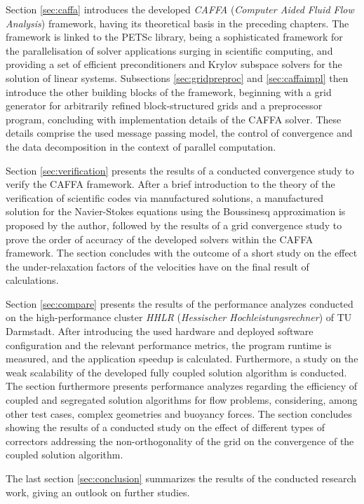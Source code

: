 Section \ref{sec:caffa} introduces the developed \emph{CAFFA} (\emph{Computer Aided Fluid Flow Analysis}) framework, having its theoretical basis in the preceding chapters. The framework is linked to the PETSc library, being a sophisticated framework for the parallelisation of solver applications surging in scientific computing, and providing a set of efficient preconditioners and Krylov subspace solvers for the solution of linear systems. Subsections \ref{sec:gridpreproc} and \ref{sec:caffaimpl} then introduce the other building blocks of the framework, beginning with a grid generator for arbitrarily refined block-structured grids and a preprocessor program, concluding with implementation details of the CAFFA solver. These details comprise the used message passing model, the control of convergence and the data decomposition in the context of parallel computation.

Section \ref{sec:verification} presents the results of a conducted convergence study to verify the CAFFA framework. After a brief introduction to the theory of the verification of scientific codes via manufactured solutions, a manufactured solution for the Navier-Stokes equations using the Boussinesq approximation is proposed by the author, followed by the results of a grid convergence study to prove the order of accuracy of the developed solvers within the CAFFA framework. The section concludes with the outcome of a short study on the effect the under-relaxation factors of the velocities have on the final result of calculations.

Section \ref{sec:compare} presents the results of the performance analyzes conducted on the high-performance cluster \emph{HHLR} (\emph{Hessischer Hochleistungsrechner}) of TU Darmstadt. After introducing the used hardware and deployed software configuration and the relevant performance metrics, the program runtime is measured, and the application speedup is calculated. Furthermore, a study on the weak scalability of the developed fully coupled solution algorithm is conducted. The section furthermore presents performance analyzes regarding the efficiency of coupled and segregated solution algorithms for flow problems, considering, among other test cases, complex geometries and buoyancy forces. The section concludes showing the results of a conducted study on the effect of different types of correctors addressing the non-orthogonality of the grid on the convergence of the coupled solution algorithm.

The last section \ref{sec:conclusion} summarizes the results of the conducted research work, giving an outlook on further studies.

